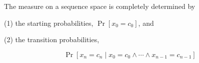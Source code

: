 The measure on a sequence space is completely determined by

(1) the starting probabilities, $\Pr[x_0 = c_0]$, and

(2) the transition probabilities,

$$\Pr[x_n = c_n \mid x_0 = c_0 \land \cdots \land x_{n-1} = c_{n-1}]$$
